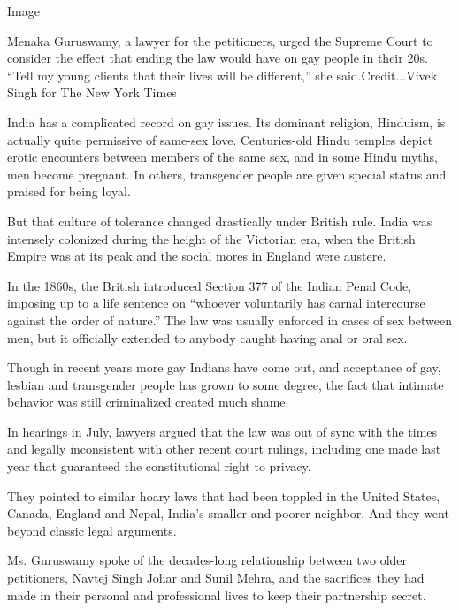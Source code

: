 Image

Menaka Guruswamy, a lawyer for the petitioners, urged the Supreme Court
to consider the effect that ending the law would have on gay people in
their 20s. ``Tell my young clients that their lives will be different,''
she said.Credit...Vivek Singh for The New York Times

India has a complicated record on gay issues. Its dominant religion,
Hinduism, is actually quite permissive of same-sex love. Centuries-old
Hindu temples depict erotic encounters between members of the same sex,
and in some Hindu myths, men become pregnant. In others, transgender
people are given special status and praised for being loyal.

But that culture of tolerance changed drastically under British rule.
India was intensely colonized during the height of the Victorian era,
when the British Empire was at its peak and the social mores in England
were austere.

In the 1860s, the British introduced Section 377 of the Indian Penal
Code, imposing up to a life sentence on ``whoever voluntarily has carnal
intercourse against the order of nature.'' The law was usually enforced
in cases of sex between men, but it officially extended to anybody
caught having anal or oral sex.

Though in recent years more gay Indians have come out, and acceptance of
gay, lesbian and transgender people has grown to some degree, the fact
that intimate behavior was still criminalized created much shame.

\href{https://www.nytimes.com/2018/07/10/world/asia/india-gay-decriminalization.html?rref=collection\%2Fbyline\%2Fkai-schultz\&action=click\&contentCollection=undefined\&region=stream\&module=stream_unit\&version=latest\&contentPlacement=6\&pgtype=collection}{In
hearings in July}, lawyers argued that the law was out of sync with the
times and legally inconsistent with other recent court rulings,
including one made last year that guaranteed the constitutional right to
privacy.

They pointed to similar hoary laws that had been toppled in the United
States, Canada, England and Nepal, India's smaller and poorer neighbor.
And they went beyond classic legal arguments.

Ms. Guruswamy spoke of the decades-long relationship between two older
petitioners, Navtej Singh Johar and Sunil Mehra, and the sacrifices they
had made in their personal and professional lives to keep their
partnership secret.

